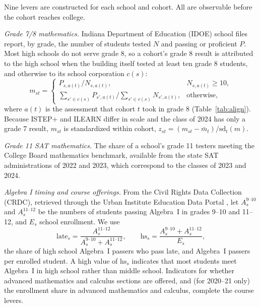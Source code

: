 \documentclass[11pt]{article}
\newcommand{\subsec}[1]{\par\vspace{1.6ex}\noindent{\large\bfseries #1}\par\vspace{0.8ex}\noindent\ignorespaces}
\begin{document}
\subsec{School-level signals}
Nine levers are constructed for each school and cohort. All are observable before the cohort reaches college.

\emph{Grade 7/8 mathematics.} Indiana Department of Education (IDOE) school files report, by grade, the number of students tested $N$ and passing or proficient $P$. Most high schools do not serve grade 8, so a cohort's grade 8 result is attributed to the high school when the building itself tested at least ten grade 8 students, and otherwise to its school corporation $c(s)$:
\begin{equation}
m_{st} = \begin{cases} P_{s,a(t)}/N_{s,a(t)}, & N_{s,a(t)} \ge 10,\\[2pt]
\sum_{s' \in c(s)} P_{s',a(t)} \big/ \sum_{s' \in c(s)} N_{s',a(t)}, & \text{otherwise},\end{cases}
\end{equation}
where $a(t)$ is the assessment that cohort $t$ took in grade 8 (Table~\ref{tab:align}). Because ISTEP+ and ILEARN differ in scale and the class of 2024 has only a grade 7 result, $m_{st}$ is standardized within cohort, $z_{st} = (m_{st} - \bar m_t)/\mathrm{sd}_t(m)$.

\emph{Grade 11 SAT mathematics.} The share of a school's grade 11 testers meeting the College Board mathematics benchmark, available from the state SAT administrations of 2022 and 2023, which correspond to the classes of 2023 and 2024.

\emph{Algebra I timing and course offerings.} From the Civil Rights Data Collection (CRDC), retrieved through the Urban Institute Education Data Portal \citep{urban2026}, let $A^{9\text{--}10}_s$ and $A^{11\text{--}12}_s$ be the numbers of students passing Algebra~I in grades 9--10 and 11--12, and $E_s$ school enrollment. We use
\begin{equation}
\text{late}_s = \frac{A^{11\text{--}12}_s}{A^{9\text{--}10}_s + A^{11\text{--}12}_s},\qquad
\text{hs}_s = \frac{A^{9\text{--}10}_s + A^{11\text{--}12}_s}{E_s},
\end{equation}
the share of high school Algebra~I passers who pass late, and Algebra~I passers per enrolled student. A high value of $\text{hs}_s$ indicates that most students meet Algebra~I in high school rather than middle school. Indicators for whether advanced mathematics and calculus sections are offered, and (for 2020--21 only) the enrollment share in advanced mathematics and calculus, complete the course levers.
\end{document}
